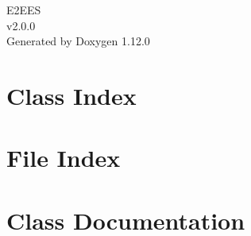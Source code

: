 \documentclass[twoside]{book}
\newcommand{\+}{\discretionary{\mbox{\scriptsize$\hookleftarrow$}}{}{}}
\newcommand{\clearemptydoublepage}{%
    \newpage{\pagestyle{empty}\cleardoublepage}%
  }
\begin{document}
  \raggedbottom
    \hypersetup{pageanchor=false,
                bookmarksnumbered=true,
                pdfencoding=unicode
               }
  \begin{titlepage}
  \vspace*{7cm}
  \begin{center}%
  {\Large E2\+EES}\\
  [1ex]\large v2.\+0.\+0 \\
  \vspace*{1cm}
  {\large Generated by Doxygen 1.12.0}\\
  \end{center}
  \end{titlepage}
  \clearemptydoublepage
  \tableofcontents
  \clearemptydoublepage
  \hypersetup{pageanchor=true}
\chapter{Class Index}

\chapter{File Index}

\chapter{Class Documentation}



















\end{document}
